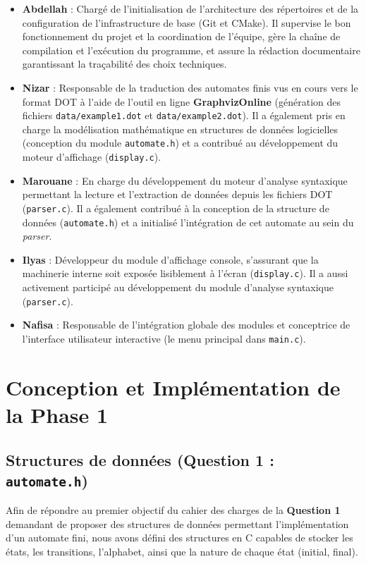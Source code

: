 \documentclass[12pt,a4paper]{article}
\begin{document}
\begin{itemize}
\item \textbf{Abdellah} : Chargé de l'initialisation de l'architecture des répertoires et de la configuration de l'infrastructure de base (Git et CMake). Il supervise le bon fonctionnement du projet et la coordination de l'équipe, gère la chaîne de compilation et l'exécution du programme, et assure la rédaction documentaire garantissant la traçabilité des choix techniques.
\item \textbf{Nizar} : Responsable de la traduction des automates finis vus en cours vers le format DOT à l'aide de l'outil en ligne \textbf{GraphvizOnline} (génération des fichiers \texttt{data/example1.dot} et \texttt{data/example2.dot}). Il a également pris en charge la modélisation mathématique en structures de données logicielles (conception du module \texttt{automate.h}) et a contribué au développement du moteur d'affichage (\texttt{display.c}).
\item \textbf{Marouane} : En charge du développement du moteur d'analyse syntaxique permettant la lecture et l'extraction de données depuis les fichiers DOT (\texttt{parser.c}). Il a également contribué à la conception de la structure de données (\texttt{automate.h}) et a initialisé l'intégration de cet automate au sein du \textit{parser}.
\item \textbf{Ilyas} : Développeur du module d'affichage console, s'assurant que la machinerie interne soit exposée lisiblement à l'écran (\texttt{display.c}). Il a aussi activement participé au développement du module d'analyse syntaxique (\texttt{parser.c}).
\item \textbf{Nafisa} : Responsable de l'intégration globale des modules et conceptrice de l'interface utilisateur interactive (le menu principal dans \texttt{main.c}).
\end{itemize}

\section{Conception et Implémentation de la Phase 1}

\subsection{Structures de données (Question 1 : \texttt{automate.h})}
Afin de répondre au premier objectif du cahier des charges de la \textbf{Question 1} demandant de proposer des structures de données permettant l'implémentation d'un automate fini, nous avons défini des structures en C capables de stocker les états, les transitions, l'alphabet, ainsi que la nature de chaque état (initial, final).
\end{document}
